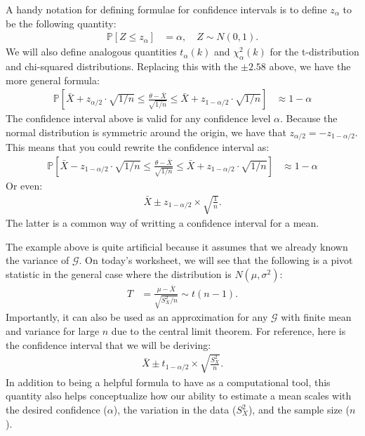 \documentclass{tufte-handout}
\newcommand{\Prob}{\mathbb{P}}
\begin{document}
A handy notation for defining formulae for confidence intervals is to define $z_{\alpha}$
to be the following quantity:
\begin{align*}
\Prob[Z \leq z_{\alpha}] &= \alpha, \quad Z \sim N(0, 1).
\end{align*}
We will also define analogous quantities $t_\alpha(k)$ and $\chi_\alpha^2(k)$ for the
t-distribution and chi-squared distributions. Replacing this with the $\pm2.58$ above, we
have the more general formula:
\begin{align*}
\Prob\left[ \bar{X} + z_{\alpha/2} \cdot \sqrt{1/n} \leq \frac{\theta - \bar{X}}{\sqrt{1/n}} \leq \bar{X} + z_{1 - \alpha/2} \cdot \sqrt{1/n} \right] &\approx 1 - \alpha
\end{align*}
The confidence interval above is valid for any confidence level $\alpha$. Because the
normal distribution is symmetric around the origin, we have that
$z_{\alpha/2} = - z_{1 - \alpha/2}$. This means that you could rewrite the confidence
interval as:
\begin{align*}
\Prob\left[ \bar{X} - z_{1 - \alpha/2} \cdot \sqrt{1/n} \leq \frac{\theta - \bar{X}}{\sqrt{1/n}} \leq \bar{X} + z_{1 - \alpha/2} \cdot \sqrt{1/n} \right] &\approx 1 - \alpha
\end{align*}
Or even:
\begin{align*}
\bar{X} \pm z_{1 - \alpha/2} \times \sqrt{\frac{1}{n}}.
\end{align*}
The latter is a common way of writting a confidence interval for a mean.

The example above is quite artificial because it assumes that we already known the variance
of $\mathcal{G}$. On today's worksheet, we will see that the following is a pivot statistic
in the general case where the distribution is $N(\mu, \sigma^2)$:
\begin{align*}
T &= \frac{\mu - \bar{X}}{\sqrt{S_X^2 / n}} \sim t(n-1).
\end{align*}
Importantly, it can also be used as an approximation for any $\mathcal{G}$ with finite mean
and variance for large $n$ due to the central limit theorem. For reference, here is the
confidence interval that we will be deriving:
\begin{align*}
\bar{X} \pm t_{1 - \alpha/2} \times \sqrt{\frac{S_X^2}{n}}.
\end{align*}
In addition to being a helpful formula to have as a computational tool, this quantity also
helps conceptualize how our ability to estimate a mean scales with the desired confidence
($\alpha$), the variation in the data ($S_X^2$), and the sample size ($n$).
\end{document}
